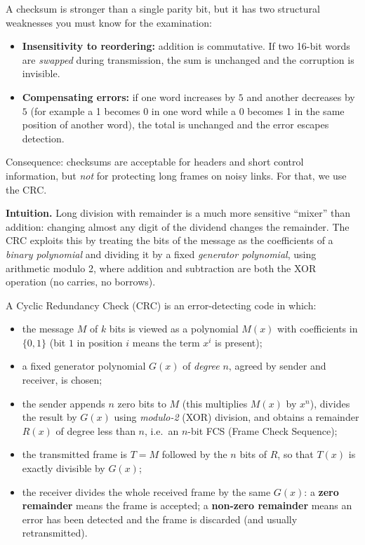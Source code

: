 \documentclass[11pt]{article}
\newcommand{\cle}[1]{{\popxbold\color{popdark}#1}}
\newcounter{popsec}
\newcounter{popsub}
\newcommand{\courssub}[1]{%
  \stepcounter{popsub}%
  \par\vspace{9pt}\noindent{\popxbold\fontsize{11.5}{13}\selectfont\color{popink}{\color{poporange}\thepopsec.\thepopsub}\hspace{6pt}#1}\par\nopagebreak\vspace{4pt}
}
\begin{document}
\begin{attention}
A checksum is stronger than a single parity bit, but it has two structural weaknesses you must know for the examination:
\begin{itemize}
\item \textbf{Insensitivity to reordering:} addition is commutative. If two 16-bit words are \emph{swapped} during transmission, the sum is unchanged and the corruption is invisible.
\item \textbf{Compensating errors:} if one word increases by $5$ and another decreases by $5$ (for example a 1 becomes 0 in one word while a 0 becomes 1 in the same position of another word), the total is unchanged and the error escapes detection.
\end{itemize}
Consequence: checksums are acceptable for headers and short control information, but \emph{not} for protecting long frames on noisy links. For that, we use the CRC.
\end{attention}

\courssub{The Cyclic Redundancy Check (CRC)}

\textbf{Intuition.} Long division with remainder is a much more sensitive ``mixer'' than addition: changing almost any digit of the dividend changes the remainder. The CRC exploits this by treating the bits of the message as the coefficients of a \emph{binary polynomial} and dividing it by a fixed \emph{generator polynomial}, using arithmetic modulo 2, where addition and subtraction are both the XOR operation (no carries, no borrows).

\begin{definition}
A \cle{Cyclic Redundancy Check} (CRC) is an error-detecting code in which:
\begin{itemize}
\item the message $M$ of $k$ bits is viewed as a polynomial $M(x)$ with coefficients in $\{0,1\}$ (bit $1$ in position $i$ means the term $x^i$ is present);
\item a fixed \cle{generator polynomial} $G(x)$ of \emph{degree} $n$, agreed by sender and receiver, is chosen;
\item the sender appends $n$ zero bits to $M$ (this multiplies $M(x)$ by $x^n$), divides the result by $G(x)$ using \emph{modulo-2} (XOR) division, and obtains a remainder $R(x)$ of degree less than $n$, i.e.\ an $n$-bit \cle{FCS} (Frame Check Sequence);
\item the transmitted frame is $T = M$ followed by the $n$ bits of $R$, so that $T(x)$ is exactly divisible by $G(x)$;
\item the receiver divides the whole received frame by the same $G(x)$: a \textbf{zero remainder} means the frame is accepted; a \textbf{non-zero remainder} means an error has been detected and the frame is discarded (and usually retransmitted).
\end{itemize}
\end{definition}
\end{document}

